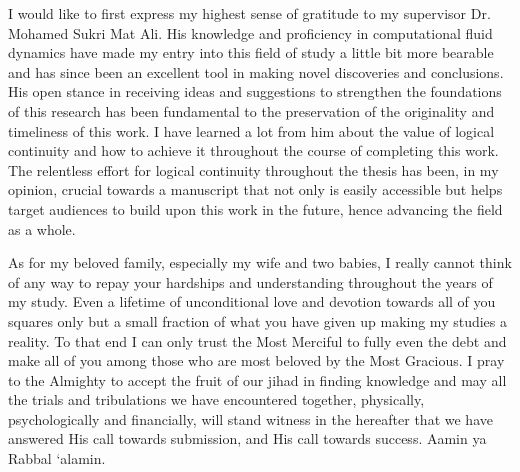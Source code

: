 \documentclass[oneside]{utmthesis}
\begin{document}
\begin{acknowledgement}
I would like to first express my highest sense of gratitude to my supervisor Dr. Mohamed Sukri Mat Ali. His knowledge and proficiency in computational fluid dynamics have made my entry into this field of study a little bit more bearable and has since been an excellent tool in making novel discoveries and conclusions. His open stance in receiving ideas and suggestions to strengthen the foundations of this research has been fundamental to the preservation of the originality and timeliness of this work. I have learned a lot from him about the value of logical continuity and how to achieve it throughout the course of completing this work. The relentless effort for logical continuity throughout the thesis has been, in my opinion, crucial towards a manuscript that not only is easily accessible but helps target audiences to build upon this work in the future, hence advancing the field as a whole.

As for my beloved family, especially my wife and two babies, I really cannot think of any way to repay your hardships and understanding throughout the years of my study. Even a lifetime of unconditional love and devotion towards all of you squares only but a small fraction of what you have given up making my studies a reality. To that end I can only trust the Most Merciful to fully even the debt and make all of you among those who are most beloved by the Most Gracious. I pray to the Almighty to accept the fruit of our jihad in finding knowledge and may all the trials and tribulations we have encountered together, physically, psychologically and financially, will stand witness in the hereafter that we have answered His call towards submission, and His call towards success. Aamin ya Rabbal `alamin.
\end{acknowledgement}
\end{document}
